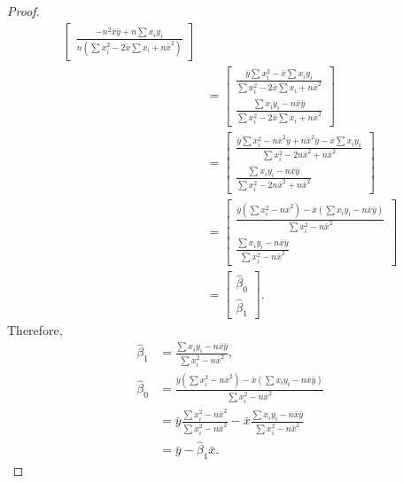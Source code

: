 \documentclass[10pt]{article}
\begin{document}
\begin{enumerate}[1)]
\begin{proof}
\begin{align*}
\begin{bmatrix}
    \frac{-n^2\bar{x}\bar{y}+n\sum{x_i y_i}}{n(\sum{x_i^2}-2\bar{x}\sum{x_i}+n\bar{x}^2)}
  \end{bmatrix}
\\
&=
  \begin{bmatrix}
    \frac{\bar{y}\sum{x_i^2}-\bar{x}\sum{x_i y_i}}{\sum{x_i^2}-2\bar{x}\sum{x_i}+n\bar{x}^2}\\
    \frac{\sum{x_i y_i}-n\bar{x}\bar{y}}{\sum{x_i^2}-2\bar{x}\sum{x_i}+n\bar{x}^2}
  \end{bmatrix}
\\
&=
  \begin{bmatrix}
    \frac{\bar{y}\sum{x_i^2}-n\bar{x}^2\bar{y}+n\bar{x}^2\bar{y}-\bar{x}\sum{x_i y_i}}{\sum{x_i^2}-2n\bar{x}^2+n\bar{x}^2}\\
    \frac{\sum{x_i y_i}-n\bar{x}\bar{y}}{\sum{x_i^2}-2n\bar{x}^2+n\bar{x}^2}
  \end{bmatrix}
\\
&=
  \begin{bmatrix}
    \frac{\bar{y}(\sum{x_i^2}-n\bar{x}^2)-\bar{x}(\sum{x_i y_i}-n\bar{x}\bar{y})}{\sum{x_i^2}-n\bar{x}^2}\\
    \frac{\sum{x_i y_i}-n\bar{x}\bar{y}}{\sum{x_i^2}-n\bar{x}^2}
  \end{bmatrix}
\\
&=
  \begin{bmatrix}
    \hat{\beta}_0\\
    \hat{\beta}_1
  \end{bmatrix}
.
\end{align*}
Therefore,
\begin{align*}
\hat{\beta}_1&=\frac{\sum{x_i y_i}-n\bar{x}\bar{y}}{\sum{x_i^2}-n\bar{x}^2},\\
\hat{\beta}_0&=\frac{\bar{y}(\sum{x_i^2}-n\bar{x}^2)-\bar{x}(\sum{x_i y_i}-n\bar{x}\bar{y})}{\sum{x_i^2}-n\bar{x}^2}\\
&=\bar{y}\frac{\sum{x_i^2}-n\bar{x}^2}{\sum{x_i^2}-n\bar{x}^2}-\bar{x}\frac{\sum{x_i y_i}-n\bar{x}\bar{y}}{\sum{x_i^2}-n\bar{x}^2}\\
&=\bar{y}-\hat{\beta}_1\bar{x}.
\end{align*}
\end{proof}


\end{enumerate}
\end{document}
